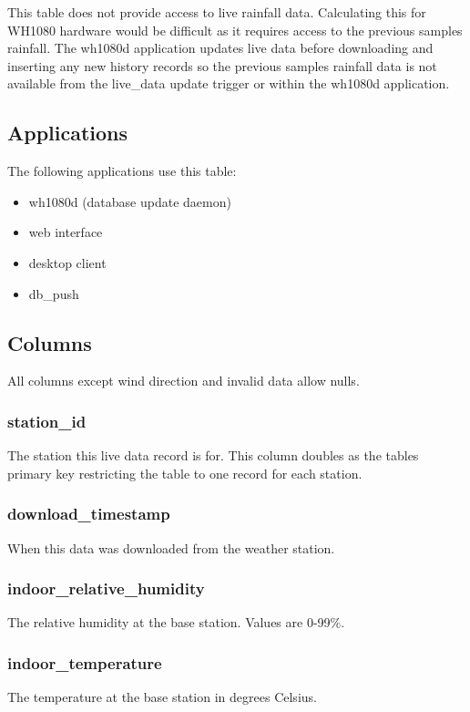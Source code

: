 \documentclass[a4paper,10pt]{book}
\begin{document}
This table does not provide access to live rainfall data. Calculating this for WH1080 hardware would be difficult as it requires access to the previous samples rainfall. The wh1080d application updates live data before downloading and inserting any new history records so the previous samples rainfall data is not available from the live\_data update trigger or within the wh1080d application.

\subsection{Applications}
The following applications use this table:
\begin{itemize}
\item wh1080d (database update daemon)
\item web interface
\item desktop client
\item db\_push
\end{itemize}

\subsection{Columns}
All columns except wind direction and invalid data allow nulls.

\subsubsection{station\_id}
The station this live data record is for. This column doubles as the tables primary key restricting the table to one record for each station.

\subsubsection{download\_timestamp}
When this data was downloaded from the weather station.

\subsubsection{indoor\_relative\_humidity}
The relative humidity at the base station. Values are 0-99\%. 

\subsubsection{indoor\_temperature}
The temperature at the base station in degrees Celsius. 
\end{document}
